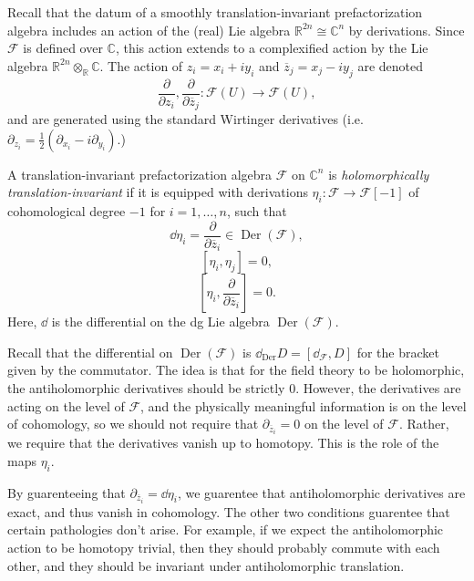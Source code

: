 Recall that the datum of a smoothly translation-invariant prefactorization algebra includes an action of the (real) Lie algebra $\mathbb{R} ^{2n} \cong \mathbb{C} ^n$ by derivations. Since $\mathcal{F} $ is defined over $\mathbb{C} $, this action extends to a complexified action by the Lie algebra $\mathbb{R} ^{2n} \otimes _{\mathbb{R} } \mathbb{C} $. The action of $z_i = x_i + iy_i$ and $\overline{z} _j = x_j - iy_j$ are denoted
\[
	\frac{\partial }{\partial z_i} ,\frac{\partial }{\partial \overline{z} _j} : \mathcal{F} (U) \to \mathcal{F} (U)
,\]
and are generated using the standard Wirtinger derivatives (i.e. $\partial _{z_i} =\frac{1}{2} (\partial _{x_i} -i \partial _{y_i} )$.)
\begin{definition}\label{dfn:5-1-1}
	A translation-invariant prefactorization algebra $\mathcal{F} $ on $\mathbb{C} ^n$ is \emph{holomorphically translation-invariant} if it is equipped with derivations $\eta _i : \mathcal{F}  \to \mathcal{F} [-1]$ of cohomological degree $-1$ for $i=1, \ldots ,n$, such that
	\[
		\dd \eta _i = \frac{\partial }{\partial \overline{z} _i} \in \operatorname{Der} (\mathcal{F} ),
	\]
	\[
		[\eta _i,\eta _j] = 0,
	\]
	\[
		\left[ \eta _i, \frac{\partial }{\partial \overline{z} _i}  \right] =0
	.\]
	Here, $\dd $ is the differential on the dg Lie algebra $\operatorname{Der} (\mathcal{F} )$.
\end{definition}

\begin{intuition}\label{int:5-1-2}
	Recall that the differential on $\operatorname{Der} (\mathcal{F} )$ is $\dd_{\mathrm{Der} }D= [\dd_{\mathcal{F} },D]$ for the bracket given by the commutator. The idea is that for the field theory to be holomorphic, the antiholomorphic derivatives should be strictly 0. However, the derivatives are acting on the level of $\mathcal{F} $, and the physically meaningful information is on the level of cohomology, so we should not require that $\partial _{\overline{z} _i} =0$ on the level of $\mathcal{F} $. Rather, we require that the derivatives vanish up to homotopy. This is the role of the maps $\eta _i$.

	By guarenteeing that $\partial _{\overline{z} _i} =\dd \eta _i$, we guarentee that antiholomorphic derivatives are exact, and thus vanish in cohomology. The other two conditions guarentee that certain pathologies don't arise. For example, if we expect the antiholomorphic action to be homotopy trivial, then they should probably commute with each other, and they should be invariant under antiholomorphic translation.
\end{intuition}


